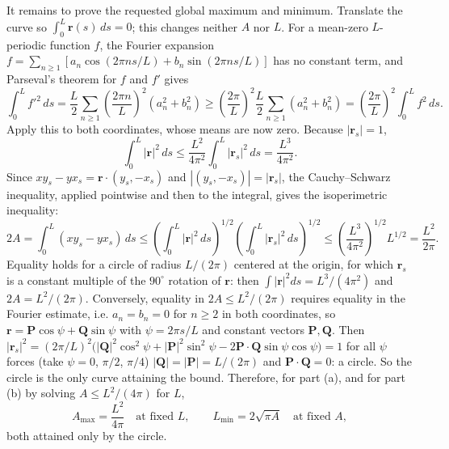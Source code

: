 It remains to prove the requested global maximum and minimum.
Translate the curve so $\int_0^L\mathbf r(s)\,ds=0$; this changes
neither $A$ nor $L$.  For a mean-zero $L$-periodic function $f$, the
Fourier expansion
$f=\sum_{n\ge1}[a_n\cos(2\pi ns/L)+b_n\sin(2\pi ns/L)]$ has no
constant term, and Parseval's theorem for $f$ and $f'$ gives
\[
 \int_0^L f'^2\,ds
 =\frac L2\sum_{n\ge1}\left(\frac{2\pi n}{L}\right)^2(a_n^2+b_n^2)
 \ge\left(\frac{2\pi}{L}\right)^2
       \frac L2\sum_{n\ge1}(a_n^2+b_n^2)
 =\left(\frac{2\pi}{L}\right)^2\int_0^L f^2\,ds.
\]
Apply this to both coordinates, whose means are now zero.  Because
$|\mathbf r_s|=1$,
\[
 \int_0^L|\mathbf r|^2\,ds
 \le\frac{L^2}{4\pi^2}\int_0^L|\mathbf r_s|^2\,ds
 =\frac{L^3}{4\pi^2}.
\]
Since $xy_s-yx_s=\mathbf r\cdot(y_s,-x_s)$ and
$|(y_s,-x_s)|=|\mathbf r_s|$, the Cauchy--Schwarz inequality, applied
pointwise and then to the integral, gives the isoperimetric
inequality:
\[
 2A=\int_0^L(xy_s-yx_s)\,ds
 \le\left(\int_0^L|\mathbf r|^2\,ds\right)^{1/2}
      \left(\int_0^L|\mathbf r_s|^2\,ds\right)^{1/2}
 \le\left(\frac{L^3}{4\pi^2}\right)^{1/2}L^{1/2}
 =\frac{L^2}{2\pi}.
\]
Equality holds for a circle of radius $L/(2\pi)$ centered at the
origin, for which $\mathbf r_s$ is a constant multiple of the
$90^\circ$ rotation of $\mathbf r$: then $\int|\mathbf r|^2ds=L^3/(4\pi^2)$
and $2A=L^2/(2\pi)$. Conversely, equality in $2A\le L^2/(2\pi)$
requires equality in the Fourier estimate, i.e. $a_n=b_n=0$ for
$n\ge2$ in both coordinates, so
$\mathbf r=\mathbf P\cos\psi+\mathbf Q\sin\psi$ with $\psi=2\pi s/L$
and constant vectors $\mathbf P,\mathbf Q$. Then
$|\mathbf r_s|^2=(2\pi/L)^2\bigl(|\mathbf Q|^2\cos^2\psi
+|\mathbf P|^2\sin^2\psi-2\mathbf P\cdot\mathbf Q\sin\psi\cos\psi\bigr)=1$
for all $\psi$ forces (take $\psi=0$, $\pi/2$, $\pi/4$)
$|\mathbf Q|=|\mathbf P|=L/(2\pi)$ and
$\mathbf P\cdot\mathbf Q=0$: a circle. So the circle is the only curve
attaining the bound. Therefore, for part (a), and for part (b) by
solving $A\le L^2/(4\pi)$ for $L$,
\[
 \boxed{A_{\max}=\frac{L^2}{4\pi}\quad\text{at fixed }L},
 \qquad
 \boxed{L_{\min}=2\sqrt{\pi A}\quad\text{at fixed }A},
\]
both attained only by the circle.


